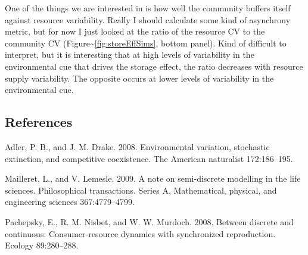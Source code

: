\documentclass[12pt,]{article}
\begin{document}
One of the things we are interested in is how well the community buffers
itself against resource variability. Really I should calculate some kind
of asynchrony metric, but for now I just looked at the ratio of the
resource CV to the community CV
(Figure\textasciitilde{}\ref{fig:storeEffSims}, bottom panel). Kind of
difficult to interpret, but it is interesting that at high levels of
variability in the environmental cue that drives the storage effect, the
ratio decreases with resource supply variability. The opposite occurs at
lower levels of variability in the environmental cue.

\pagebreak{}

\subsection{References}\label{references}

Adler, P. B., and J. M. Drake. 2008. Environmental variation, stochastic
extinction, and competitive coexistence. The American naturalist
172:186--195.

Mailleret, L., and V. Lemesle. 2009. A note on semi-discrete modelling
in the life sciences. Philosophical transactions. Series A,
Mathematical, physical, and engineering sciences 367:4779--4799.

Pachepsky, E., R. M. Nisbet, and W. W. Murdoch. 2008. Between discrete
and continuous: Consumer-resource dynamics with synchronized
reproduction. Ecology 89:280--288.
\end{document}
